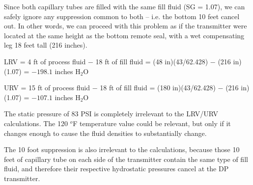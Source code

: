 
Since both capillary tubes are filled with the same fill fluid (SG = 1.07), we can safely ignore any suppression common to both -- i.e. the bottom 10 feet cancel out.  In other words, we can proceed with this problem as if the transmitter were located at the same height as the bottom remote seal, with a wet compensating leg 18 feet tall (216 inches).

\vskip 10pt

LRV = 4 ft of process fluid $-$ 18 ft of fill fluid = (48 in)(43/62.428) $-$ (216 in)(1.07) = $-198.1$ inches H$_{2}$O

URV = 15 ft of process fluid $-$ 18 ft of fill fluid = (180 in)(43/62.428) $-$ (216 in)(1.07) = $-107.1$ inches H$_{2}$O 

\vskip 10pt

The static pressure of 83 PSI is completely irrelevant to the LRV/URV calculations.  The 120 $^{o}$F temperature value could be relevant, but only if it changes enough to cause the fluid densities to substantially change.

The 10 foot suppression is also irrelevant to the calculations, because those 10 feet of capillary tube on each side of the transmitter contain the same type of fill fluid, and therefore their respective hydrostatic pressures cancel at the DP transmitter.



